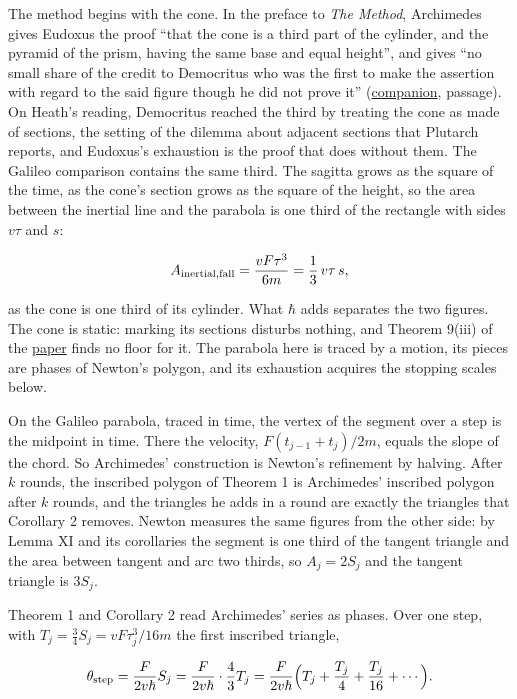 \documentclass[11pt,a4paper]{article}
\begin{document}
The method begins with the cone. In the preface to \emph{The Method},
Archimedes gives Eudoxus the proof ``that the cone is a third part of
the cylinder, and the pyramid of the prism, having the same base and
equal height'', and gives ``no small share of the credit to Democritus
who was the first to make the assertion with regard to the said figure
though he did not prove it''
(\href{../docs/classics/Archimedes_Method_Heath1912_OCR.md}{companion},
passage). On Heath's reading, Democritus reached the third by treating
the cone as made of sections, the setting of the dilemma about adjacent
sections that Plutarch reports, and Eudoxus's exhaustion is the proof
that does without them. The Galileo comparison contains the same third.
The sagitta grows as the square of the time, as the cone's section grows
as the square of the height, so the area between the inertial line and
the parabola is one third of the rectangle with sides \(v\tau\) and
\(s\):

\[A_{\rm inertial,fall}=\frac{vF\tau^3}{6m}=\frac13\,v\tau\,s,\]

as the cone is one third of its cylinder. What \(\hbar\) adds separates
the two figures. The cone is static: marking its sections disturbs
nothing, and Theorem 9(iii) of the \href{planck-gap-paper.md}{paper}
finds no floor for it. The parabola here is traced by a motion, its
pieces are phases of Newton's polygon, and its exhaustion acquires the
stopping scales below.

On the Galileo parabola, traced in time, the vertex of the segment over
a step is the midpoint in time. There the velocity,
\(F(t_{j-1}+t_j)/2m\), equals the slope of the chord. So Archimedes'
construction is Newton's refinement by halving. After \(k\) rounds, the
inscribed polygon of Theorem 1 is Archimedes' inscribed polygon after
\(k\) rounds, and the triangles he adds in a round are exactly the
triangles that Corollary 2 removes. Newton measures the same figures
from the other side: by Lemma XI and its corollaries the segment is one
third of the tangent triangle and the area between tangent and arc two
thirds, so \(A_j=2S_j\) and the tangent triangle is \(3S_j\).

Theorem 1 and Corollary 2 read Archimedes' series as phases. Over one
step, with \(T_j=\frac34S_j=vF\tau_j^3/16m\) the first inscribed
triangle,

\[\theta_{\rm step}=\frac{F}{2v\hbar}S_j=\frac{F}{2v\hbar}\cdot\frac43T_j
=\frac{F}{2v\hbar}\Bigl(T_j+\frac{T_j}4+\frac{T_j}{16}+\cdots\Bigr).\]
\end{document}
